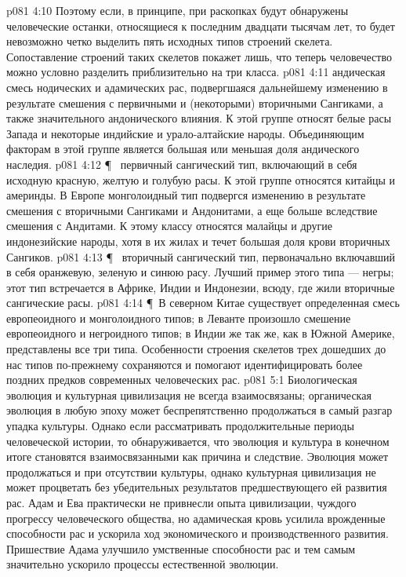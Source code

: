 \vs p081 4:10 Поэтому если, в принципе, при раскопках будут обнаружены человеческие останки, относящиеся к последним двадцати тысячам лет, то будет невозможно четко выделить пять исходных типов строений скелета. Сопоставление строений таких скелетов покажет лишь, что теперь человечество можно условно разделить приблизительно на три класса.
\vs p081 4:11 \bibnobreakspace {} андическая смесь нодических и адамических рас, подвергшаяся дальнейшему изменению в результате смешения с первичными и (некоторыми) вторичными Сангиками, а также значительного андонического влияния. К этой группе относят белые расы Запада и некоторые индийские и урало\hyp{}алтайские народы. Объединяющим факторам в этой группе является большая или меньшая доля андического наследия.
\vs p081 4:12 \P\ \bibnobreakspace {} первичный сангический тип, включающий в себя исходную красную, желтую и голубую расы. К этой группе относятся китайцы и америнды. В Европе монголоидный тип подвергся изменению в результате смешения с вторичными Сангиками и Андонитами, а еще больше вследствие смешения с Андитами. К этому классу относятся малайцы и другие индонезийские народы, хотя в их жилах и течет большая доля крови вторичных Сангиков.
\vs p081 4:13 \P\ \bibnobreakspace {} вторичный сангический тип, первоначально включавший в себя оранжевую, зеленую и синюю расу. Лучший пример этого типа --- негры; этот тип встречается в Африке, Индии и Индонезии, всюду, где жили вторичные сангические расы.
\vs p081 4:14 \P\ В северном Китае существует определенная смесь европеоидного и монголоидного типов; в Леванте произошло смешение европеоидного и негроидного типов; в Индии же так же, как в Южной Америке, представлены все три типа. Особенности строения скелетов трех дошедших до нас типов по\hyp{}прежнему сохраняются и помогают идентифицировать более поздних предков современных человеческих рас.
\vs p081 5:1 Биологическая эволюция и культурная цивилизация не всегда взаимосвязаны; органическая эволюция в любую эпоху может беспрепятственно продолжаться в самый разгар упадка культуры. Однако если рассматривать продолжительные периоды человеческой истории, то обнаруживается, что эволюция и культура в конечном итоге становятся взаимосвязанными как причина и следствие. Эволюция может продолжаться и при отсутствии культуры, однако культурная цивилизация не может процветать без убедительных результатов предшествующего ей развития рас. Адам и Ева практически не привнесли опыта цивилизации, чуждого прогрессу человеческого общества, но адамическая кровь усилила врожденные способности рас и ускорила ход экономического и производственного развития. Пришествие Адама улучшило умственные способности рас и тем самым значительно ускорило процессы естественной эволюции.
